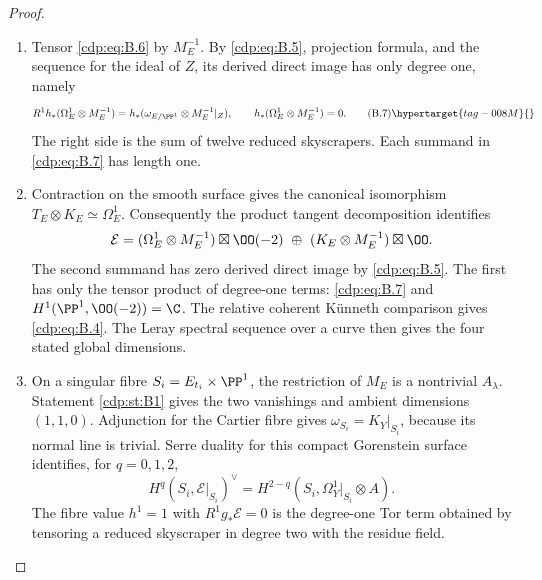 \begin{proof}
\begin{enumerate}[label=\arabic*.,leftmargin=*]
\item Tensor \eqref{cdp:eq:B.6} by $M_E^{-1}$. By \eqref{cdp:eq:B.5}, projection formula, and the sequence for the ideal of $Z$, its derived direct image has only degree one, namely
\[
 R^1h_*(\Omega^1_E\otimes M_E^{-1})
 =h_*(\omega_{E/\PP^1}\otimes M_E^{-1}|_Z),
 \qquad h_*(\Omega^1_E\otimes M_E^{-1})=0.             \tag{B.7}\hypertarget{tag-008M}{}\label{cdp:eq:B.7}
\]
The right side is the sum of twelve reduced skyscrapers. Each summand in \eqref{cdp:eq:B.7} has length one.

\item Contraction on the smooth surface gives the canonical isomorphism $T_E\otimes K_E\simeq\Omega^1_E$. Consequently the product tangent decomposition identifies
\[
\mathcal E=(\Omega^1_E\otimes M_E^{-1})\boxtimes\OO(-2)
 \ \oplus\ (K_E\otimes M_E^{-1})\boxtimes\OO.
\]
The second summand has zero derived direct image by \eqref{cdp:eq:B.5}. The first has only the tensor product of degree-one terms: \eqref{cdp:eq:B.7} and $H^1(\PP^1,\OO(-2))=\C$. The relative coherent K\"unneth comparison gives \eqref{cdp:eq:B.4}. The Leray spectral sequence over a curve then gives the four stated global dimensions.

\item On a singular fibre $S_i=E_{t_i}\times\PP^1$, the restriction of $M_E$ is a nontrivial $A_\lambda$. Statement \ref{cdp:st:B1} gives the two vanishings and ambient dimensions $(1,1,0)$. Adjunction for the Cartier fibre gives $\omega_{S_i}=K_Y|_{S_i}$, because its normal line is trivial. Serre duality for this compact Gorenstein surface identifies, for $q=0,1,2$,
\[
 H^q(S_i,\mathcal E|_{S_i})^\vee
 =H^{2-q}(S_i,\Omega_Y^1|_{S_i}\otimes A).
\]
The fibre value $h^1=1$ with $R^1g_*\mathcal E=0$ is the degree-one Tor term obtained by tensoring a reduced skyscraper in degree two with the residue field.

\end{enumerate}
\end{proof}